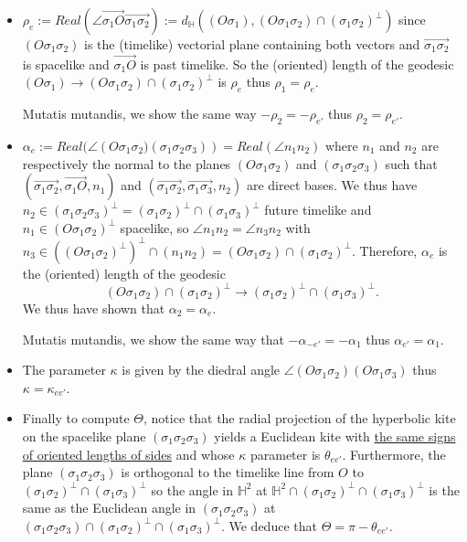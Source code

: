 \documentclass[a4paper,12pt]{article}
\def\H{\mathbb{H}}
\theoremstyle{definition}
\begin{document}
					\begin{itemize}
					 \item $\rho_e:=Real\left(\angle{} \overrightarrow{\sigma_1O}\overrightarrow{\sigma_1\sigma_2}\right):= d_{\H}\left((O\sigma_1), (O\sigma_1\sigma_2)\cap (\sigma_1\sigma_2)^{\perp}\right)$ since $(O\sigma_1\sigma_2)$ is the (timelike) vectorial plane containing both vectors and $\overrightarrow{\sigma_1\sigma_2}$ is spacelike and  $\overrightarrow{\sigma_1O}$ is past timelike. So the (oriented) length of the geodesic $(O\sigma_1) \rightarrow (O\sigma_1\sigma_2)\cap (\sigma_1\sigma_2)^\perp$ is  $\rho_{e}$ thus $\rho_1=\rho_e$.
					 
					  Mutatis mutandis, we show the same way $-\rho_2=-\rho_{e'}$ thus $\rho_2=\rho_{e'}$. 
					 
					 \item $\alpha_e := Real(\angle \left(O\sigma_1\sigma_2) (\sigma_1\sigma_2\sigma_3)\right)=Real(\angle n_1n_2)$ where $n_1$ and  $n_2$ are respectively the normal to the planes $(O\sigma_1\sigma_2)$ and $(\sigma_1\sigma_2\sigma_3)$ such that 
					 $(\overrightarrow{\sigma_1\sigma_2},\overrightarrow{\sigma_1O},n_1)$ and $(\overrightarrow{\sigma_1\sigma_2},\overrightarrow{\sigma_1\sigma_3},n_2)$ are direct bases. 
					 We thus have $n_2 \in (\sigma_1\sigma_2\sigma_3)^\perp = (\sigma_1\sigma_2)^\perp\cap (\sigma_1\sigma_3)^\perp$ future timelike and
					 $n_1\in (O\sigma_1\sigma_2)^\perp$ spacelike, so $\angle n_1n_2 = \angle n_3n_2$ with $n_3 \in( (O\sigma_1\sigma_2)^\perp)^\perp \cap (n_1n_2) = (O\sigma_1\sigma_2)\cap (\sigma_1\sigma_2)^\perp$. 
					 Therefore, $\alpha_e$ is the (oriented) length of the geodesic  
					 $$ (O\sigma_1\sigma_2)\cap (\sigma_1\sigma_2)^\perp  \rightarrow  (\sigma_1\sigma_2)^\perp \cap (\sigma_1\sigma_3)^\perp.$$
					 We thus have shown that $\alpha_2=\alpha_e$.
					 
					 Mutatis mutandis, we show the same way that $-\alpha_{-e'} =-\alpha_1$ thus $\alpha_{e'}=\alpha_1$.
					 \item The parameter  $\kappa$ is given by the diedral angle $\angle (O\sigma_1\sigma_2) (O\sigma_1\sigma_3)$ thus $\kappa=\kappa_{ee'}$.
					 \item Finally to compute $\Theta$,  notice that the radial projection of  the hyperbolic kite on the spacelike plane $(\sigma_1\sigma_2\sigma_3)$ yields a Euclidean kite with \underline{the same signs of oriented lengths of sides} and whose $\kappa$ parameter is $\theta_{ee'}$.		Furthermore, the plane $(\sigma_1\sigma_2\sigma_3)$ is orthogonal to the timelike line from $O$ to $(\sigma_1\sigma_2)^\perp \cap (\sigma_1\sigma_3)^\perp$ so the angle in $\H^2$ at $\H^2\cap (\sigma_1\sigma_2)^\perp \cap (\sigma_1\sigma_3)^\perp$ is the same as the Euclidean angle in $(\sigma_1\sigma_2\sigma_3)$ at $(\sigma_1\sigma_2\sigma_3)\cap(\sigma_1\sigma_2)^\perp \cap (\sigma_1\sigma_3)^\perp$. 
					 We deduce that $\Theta=\pi-\theta_{ee'}$.
					\end{itemize}
\end{document}
